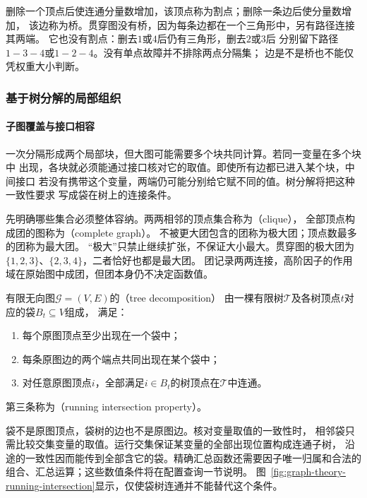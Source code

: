 删除一个顶点后使连通分量数增加，该顶点称为割点；删除一条边后使分量数增加，
该边称为桥。贯穿图没有桥，因为每条边都在一个三角形中，另有路径连接其两端。
它也没有割点：删去\(1\)或\(4\)后仍有三角形，删去\(2\)或\(3\)后
分别留下路径\(1-3-4\)或\(1-2-4\)。没有单点故障并不排除两点分隔集；
边是不是桥也不能仅凭权重大小判断。

\subsubsection{基于树分解的局部组织}
\label{sec:graph-theory-tree-decomposition}

\paragraph{子图覆盖与接口相容}

一次分隔形成两个局部块，但大图可能需要多个块共同计算。若同一变量在多个块中
出现，各块就必须能通过接口核对它的取值。即使所有边都已进入某个块，中间接口
若没有携带这个变量，两端仍可能分别给它赋不同的值。树分解将把这种一致性要求
写成袋在树上的连接条件。

先明确哪些集合必须整体容纳。两两相邻的顶点集合称为（clique），
全部顶点构成团的图称为（complete graph）。
不被更大团包含的团称为极大团；顶点数最多的团称为最大团。
“极大”只禁止继续扩张，不保证大小最大。贯穿图的极大团为
\(\{1,2,3\}\)、\(\{2,3,4\}\)，二者恰好也都是最大团。
团记录两两连接，高阶因子的作用域在原始图中成团，但团本身仍不决定函数值。

\begin{definition}[树分解]
  \label{def:graph-theory-tree-decomposition}
  有限无向图\(\mathcal G=(V,E)\)的（tree decomposition）
  由一棵有限树\(\mathcal T\)及各树顶点\(t\)对应的袋\(B_t\subseteq V\)组成，
  满足：
  \begin{enumerate}
    \item 每个原图顶点至少出现在一个袋中；
    \item 每条原图边的两个端点共同出现在某个袋中；
    \item 对任意原图顶点\(i\)，全部满足\(i\in B_t\)的树顶点在\(\mathcal T\)中连通。
  \end{enumerate}
  第三条称为（running intersection property）。
\end{definition}

袋不是原图顶点，袋树的边也不是原图边。核对变量取值的一致性时，
相邻袋只需比较交集变量的取值。运行交集保证某变量的全部出现位置构成连通子树，
沿途的一致性因而能传到全部含它的袋。精确汇总函数还需要因子唯一归属和合法的
组合、汇总运算；这些数值条件将在配置查询一节说明。
图~\ref{fig:graph-theory-running-intersection}显示，仅使袋树连通并不能替代这个条件。

